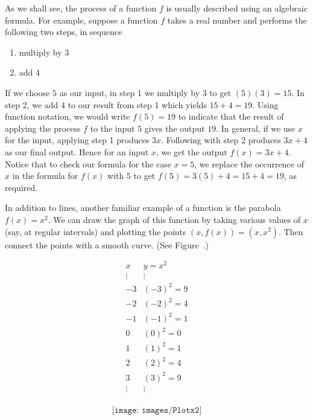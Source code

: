  \medskip
 
 As we shall see, the process of a function $f$ is usually described using an algebraic formula. For example, suppose a function $f$ takes a real number and performs the following two steps, in sequence
 
 \begin{enumerate}
 	
 	\item  multiply by 3
 	
 	\item  add 4
 	
 \end{enumerate}
 
 If we choose $5$ as our input,  in step 1 we multiply by $3$ to get $(5)(3) = 15$.  In step 2, we add 4 to our result from step 1 which yields $15 + 4 = 19$.  Using function notation, we would write  $f(5) = 19$ to indicate that the result of applying the process $f$ to the input $5$ gives the output $19$.  In general, if we use $x$ for the input, applying step 1 produces $3x$.  Following with step 2 produces $3x+4$ as our final output.  Hence for an input $x$, we get the output $f(x) = 3x + 4$.  Notice that to check our formula for the case $x=5$, we replace the occurrence of $x$ in the formula for $f(x)$ with $5$ to get $f(5) = 3(5) + 4 = 15 + 4 = 19$, as required.


\begin{minipage}{0.4\textwidth}
In addition to lines, another familiar example of a  
function is the parabola $f(x)=x^2$.  We can draw the graph of this
function by taking various values of $x$ (say, at regular intervals) and
plotting the points $(x,f(x))=(x,x^2)$.  Then connect the points with a
smooth curve.  (See Figure~.)\\
\end{minipage} 
\begin{minipage}{0.3\textwidth}
	$$\begin{array}{r|r}
		x & y=x^{2}\\ \hline
	\vdots & \vdots \\	
	-3 & (-3)^{2} = 9 \\
	-2 & (-2)^{2} = 4 \\
	-1 & (-1)^{2} = 1 \\
	0 & (0)^{2} = 0 \\
	1 & (1)^{2} = 1 \\
	2 & (2)^{2} = 4 \\
	3 & (3)^{2} = 9 \\
	\vdots & \vdots \\
\end{array} $$	
\end{minipage}
\begin{minipage}{0.3\textwidth}
	\begin{figure}[H]
	$$\texttt{[image: images/Plotx2]}$$
	\caption{ \label{fig:graphx2}}
	\end{figure} 
\end{minipage}
	


